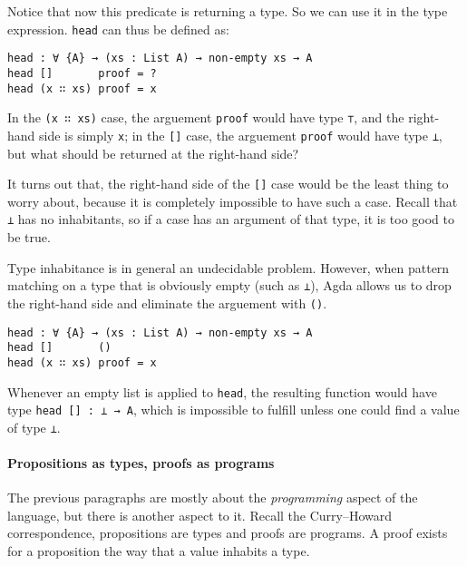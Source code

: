 \documentclass[../thesis.tex]{subfiles}
\begin{document}
Notice that now this predicate is returning a type. So we can use it in the type
expression. {\lstinline|head|} can thus be defined as:

\begin{lstlisting}
head : ∀ {A} → (xs : List A) → non-empty xs → A
head []       proof = ?
head (x ∷ xs) proof = x
\end{lstlisting}

In the {\lstinline|(x ∷ xs)|} case, the arguement {\lstinline|proof|} would
have type {\lstinline|⊤|}, and the right-hand side is simply {\lstinline|x|};
in the {\lstinline|[]|} case, the arguement {\lstinline|proof|} would
have type {\lstinline|⊥|}, but what should be returned at the right-hand side?

It turns out that, the right-hand side of the {\lstinline|[]|} case would be the
least thing to worry about, because it is completely impossible to have such a case.
Recall that {\lstinline|⊥|} has no inhabitants, so if a case has an argument of
that type, it is too good to be true.

Type inhabitance is in general an undecidable problem.
However, when pattern matching on a type that is obviously empty (such as {\lstinline|⊥|}),
Agda allows us to drop the right-hand side and eliminate the arguement with {\lstinline|()|}.

\begin{lstlisting}
head : ∀ {A} → (xs : List A) → non-empty xs → A
head []       ()
head (x ∷ xs) proof = x
\end{lstlisting}

Whenever an empty list is applied to {\lstinline|head|},
the resulting function would have type {\lstinline|head [] : ⊥ → A|},
which is impossible to fulfill unless one could find a value of type {\lstinline|⊥|}.


\paragraph{Propositions as types, proofs as programs}

The previous paragraphs are mostly about the \textit{programming}
aspect of the language, but there is another aspect to it.
Recall the Curry–Howard correspondence, propositions are types and proofs are
programs. A proof exists for a proposition the way that a value inhabits a type.
\end{document}
